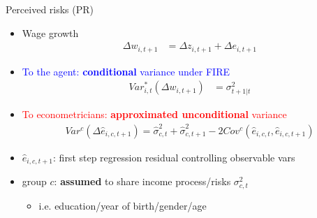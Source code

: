 \documentclass{beamer}
\begin{document}
\begin{frame}{Perceived risks (PR)}
	\begin{itemize}
		\item Wage growth 
		\begin{equation*}
			\begin{split}
				\Delta w_{i,t+1} & =\Delta z_{i,t+1} +\Delta e_{i,t+1} 
			\end{split}
		\end{equation*}
		\item \textcolor{blue}{To the agent: \textbf{conditional} variance under FIRE}
		\begin{equation*}
			\begin{split}
				Var^*_{i,t}(\Delta w_{i,t+1}) & =\sigma^2_{t+1|t}
			\end{split}
		\end{equation*}
		\item \textcolor{red}{To econometricians: \textbf{approximated unconditional} variance} 
		\begin{equation*}
			\begin{split}
				Var^c(\Delta \hat e_{i,c,t+1})     = \hat\sigma^2_{c,t}+ \hat\sigma^2_{c,t+1} - 2Cov^c(\hat e_{i,c,t},\hat e_{i,c,t+1})
			\end{split}
		\end{equation*}
	\item $\hat e_{i,c,t+1}$: first step regression residual controlling observable vars
	\item group $c$: \textbf{assumed} to share income process/risks $\sigma^2_{c,t}$
	\begin{itemize}
		\item i.e. education/year of birth/gender/age
	\end{itemize}
		
	\end{itemize}	
\end{frame}
\end{document}
